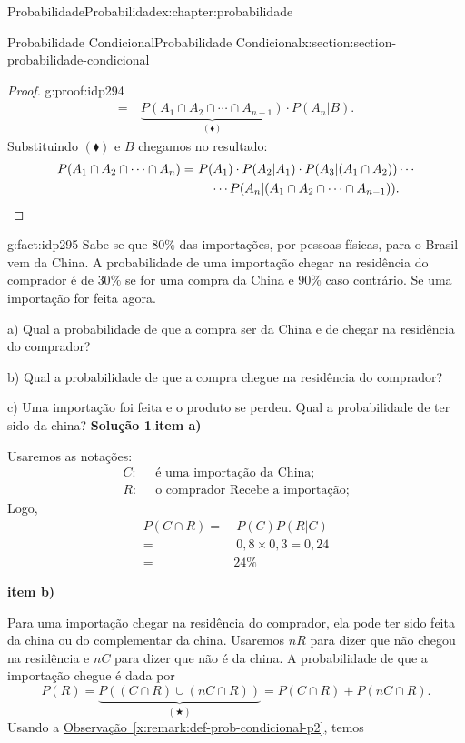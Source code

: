 \documentclass[oneside,10pt,]{book}
\newcommand{\blocktitlefont}{\relax}
\newcommand{\xreffont}{\relax}
\newcommand{\terminology}[1]{\textbf{#1}}
\newcommand{\qedhere}{\relax}
\numberwithin{equation}{section}
\newcommand{\amp}{&}
\begin{document}
\begin{chapterptx}{Probabilidade}{}{Probabilidade}{}{}{x:chapter:probabilidade}
\begin{sectionptx}{Probabilidade Condicional}{}{Probabilidade Condicional}{}{}{x:section:section-probabilidade-condicional}
\begin{proof}{}{g:proof:idp294}
\begin{align*}
= \amp  ~ \underbrace{P(A_1\cap A_2\cap \cdots \cap A_{n-1})}_{(\blacklozenge)}\cdot P(A_n|B). 
\end{align*}
Substituindo \((\blacklozenge)\) e \(B\) chegamos no resultado:%
\begin{align*}
P(A_1\cap A_2\cap \cdots \cap A_n) = \amp ~ P(A_1)\cdot P(A_2|A_1)\cdot P(A_3|(A_1\cap A_2))\cdots \\
\amp ~~~~ \cdots P(A_n|(A_1\cap A_2\cap \cdots \cap A_{n-1})). \qedhere
\end{align*}
%
\end{proof}
\begin{fact}{}{}{g:fact:idp295}%
Sabe-se que \(80\%\) das importações, por pessoas físicas, para o Brasil vem da China. A probabilidade de uma importação chegar na residência do comprador é de \(30\%\) se for uma compra da China e \(90\%\) caso contrário.  Se uma importação for feita agora.%
\par
a) Qual a probabilidade de que a compra ser da China e de chegar na residência do comprador?%
\par
b) Qual a probabilidade de que a compra chegue na residência do comprador?%
\par
c) Uma importação foi feita e o produto se perdeu. Qual a probabilidade de ter sido da china?%
\textbf{\blocktitlefont Solução 1}.\quad{}\terminology{item a)}%
\par
Usaremos as notações:%
\begin{align*}
C: \amp ~ \text{ é uma importação da China;} \\
R: \amp ~ \text{ o comprador Recebe a importação;} 
\end{align*}
Logo,%
\begin{align*}
P(C\cap R) = \amp ~ P(C) P(R|C) \\
= \amp ~ 0,8\times 0,3 = 0,24\\
= \amp 24\% 
\end{align*}
%
\par
\terminology{item b)}%
\par
Para uma importação chegar na residência do comprador, ela pode ter sido feita da china ou do complementar da china. Usaremos \(nR\) para dizer que não chegou na residência e \(nC\) para dizer que não é da china. A probabilidade de que a importação chegue é dada por%
\begin{equation*}
P(R) = \underbrace{P( (C\cap R) \cup (nC\cap R))}_{(\bigstar)} = P(C\cap R) + P(nC\cap R). 
\end{equation*}
Usando a \hyperref[x:remark:def-prob-condicional-p2]{Observação~{\xreffont\ref{x:remark:def-prob-condicional-p2}}}, temos%

\end{fact}
\end{sectionptx}
\end{chapterptx}
\end{document}

